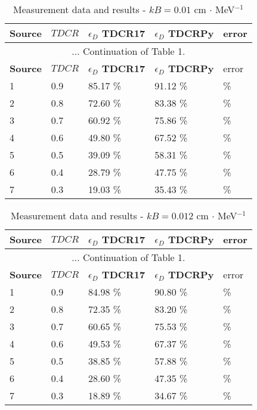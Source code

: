 \documentclass[12pt]{iopart}
\begin{document}
\pagebreak

\begingroup
\footnotesize
\begin{longtable}[l]{| p{} | p{} | p{} |p{} |p{} |} 
\caption{Measurement data and results - $kB = 0.01$ cm $\cdot$ MeV$^{-1}$}
\label{Table1} \\ 
\hline
\textbf{Source} & \textbf{$TDCR$} & \textbf{$\epsilon_{D}$ TDCR17} & \textbf{$\epsilon_{D}$ TDCRPy} & error \\ 
\endfirsthead
\multicolumn{5}{c}{... Continuation of Table 1.}\\ 
\hline
 \textbf{Source} & \textbf{$TDCR$} & \textbf{$\epsilon_{D}$ TDCR17} & \textbf{$\epsilon_{D}$ TDCRPy} & error \\   \hline 
\endhead
\hline
 1 &  0.9  & 85.17 \% &  91.12 \% &  \% \\
 2 &  0.8  & 72.60 \% &  83.38 \% &  \% \\
 3 &  0.7  & 60.92 \% &  75.86 \% &  \% \\
 4 &  0.6  & 49.80 \% &  67.52 \% &  \% \\
 5 &  0.5  & 39.09 \% &  58.31 \% &  \% \\
 6 &  0.4  & 28.79 \% &  47.75 \% &  \% \\
 7 &  0.3  & 19.03 \% &  35.43 \% &  \% \\
\hline
\end{longtable} 
\endgroup

\begingroup
\footnotesize
\begin{longtable}[l]{| p{} | p{} |p{} |p{} |p{} |} 
\caption{Measurement data and results - $kB = 0.012$ cm $\cdot$ MeV$^{-1}$}
\label{Table1} \\ 
\hline
\textbf{Source} & \textbf{$TDCR$} & \textbf{$\epsilon_{D}$ TDCR17} & \textbf{$\epsilon_{D}$ TDCRPy} & error \\ 
\endfirsthead
\multicolumn{5}{c}{... Continuation of Table 1.}\\ 
\hline
 \textbf{Source} & \textbf{$TDCR$} & \textbf{$\epsilon_{D}$ TDCR17} & \textbf{$\epsilon_{D}$ TDCRPy} & error \\   \hline 
\endhead
\hline
 1 & 0.9   &  84.98 \% &  90.80 \% & \% \\
 2 & 0.8   &  72.35 \% &  83.20 \% & \% \\
 3 & 0.7   &  60.65 \% &  75.53 \% & \% \\
 4 & 0.6   &  49.53 \% &  67.37 \% & \% \\
 5 & 0.5   &  38.85 \% &  57.88 \% & \% \\
 6 & 0.4   &  28.60 \% &  47.35 \% & \% \\
 7 & 0.3   &  18.89 \% &  34.67 \% & \% \\
\hline
\end{longtable} 
\endgroup
\end{document}

